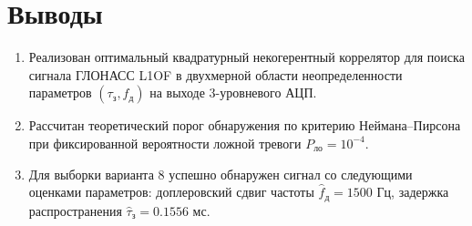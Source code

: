 \section{Выводы}
\begin{enumerate}
    \item Реализован оптимальный квадратурный некогерентный коррелятор для поиска сигнала ГЛОНАСС L1OF в двухмерной области неопределенности параметров $(\tau_{\text{з}}, f_{\text{д}})$ на выходе 3-уровневого АЦП.
    \item Рассчитан теоретический порог обнаружения по критерию Неймана--Пирсона при фиксированной вероятности ложной тревоги $P_{\text{ло}} = 10^{-4}$.
    \item Для выборки варианта 8 успешно обнаружен сигнал со следующими оценками параметров: доплеровский сдвиг частоты $\hat{f}_{\text{д}} = 1500\text{ Гц}$, задержка распространения $\hat{\tau}_{\text{з}} = 0.1556\text{ мс}$.
\end{enumerate}
